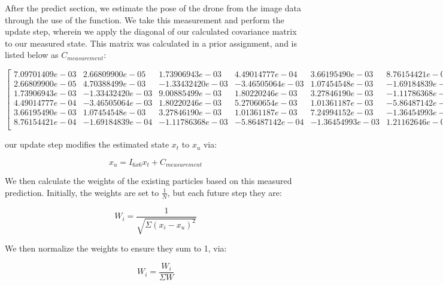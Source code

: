 \documentclass{article}
\begin{document}
After the predict section, we estimate the pose of the drone from the image data through the use of the  function. We take this measurement and perform the update step, wherein we apply the diagonal of our calculated covariance matrix to our measured state. This matrix was calculated in a prior assignment, and is listed below as $C_{measurement}$:

\begin{equation}
    \begin{bmatrix}
        7.09701409e-03 & 2.66809900e-05  & 1.73906943e-03  & 4.49014777e-04  & 3.66195490e-03  & 8.76154421e-04  \\
        2.66809900e-05 & 4.70388499e-03  & -1.33432420e-03 & -3.46505064e-03 & 1.07454548e-03  & -1.69184839e-04 \\
        1.73906943e-03 & -1.33432420e-03 & 9.00885499e-03  & 1.80220246e-03  & 3.27846190e-03  & -1.11786368e-03 \\
        4.49014777e-04 & -3.46505064e-03 & 1.80220246e-03  & 5.27060654e-03  & 1.01361187e-03  & -5.86487142e-04 \\
        3.66195490e-03 & 1.07454548e-03  & 3.27846190e-03  & 1.01361187e-03  & 7.24994152e-03  & -1.36454993e-03 \\
        8.76154421e-04 & -1.69184839e-04 & -1.11786368e-03 & -5.86487142e-04 & -1.36454993e-03 & 1.21162646e-03  \\
    \end{bmatrix}
\end{equation}

our update step modifies the estimated state $x_t$ to $x_u$ via:

\begin{equation}
    x_u = I_{6x6} x_t + C_{measurement}
\end{equation}

We then calculate the weights of the existing particles based on this measured prediction. Initially, the weights are set to $\frac{1}{N}$, but each future step they are:

\begin{equation}
    W_i = \frac{1}{\sqrt{\Sigma (x_i - x_u)^2}}
\end{equation}

We then normalize the weights to ensure they sum to 1, via:

\begin{equation}
    W_i = \frac{W_i}{\Sigma W}
\end{equation}
\end{document}
